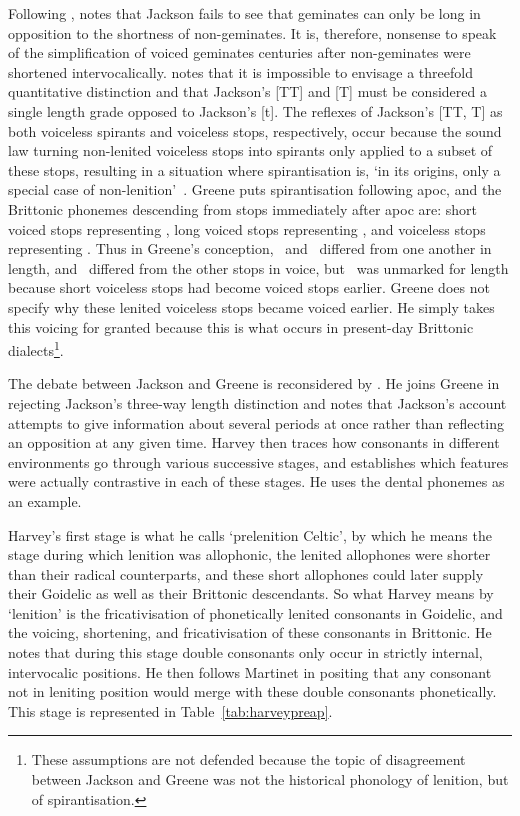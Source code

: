 Following \textcite{martinet_celtic_1952}, \textcite{greene_gemination_1956} notes that Jackson fails to see that geminates can only be long in opposition to the shortness of non-geminates. It is, therefore, nonsense to speak of the simplification of voiced geminates centuries after non-geminates were shortened intervocalically. \Textcite{Gre_Spirant66} notes that it is impossible to envisage a threefold quantitative distinction  and that Jackson's [TT] and [T] must be considered a single length grade opposed to Jackson's [t]. The  reflexes of Jackson's [TT, T] as both voiceless spirants and voiceless stops, respectively, occur because the sound law turning non-lenited voiceless stops into spirants  only applied to a subset of these stops, resulting in a situation where spirantisation is, `in its origins, only a special case of non-lenition'~\autocite[119]{Gre_Spirant66}. Greene puts spirantisation following \gls{apoc}, and the Brittonic \gls{phoneme}s descending from stops immediately after \gls{apoc} are: short voiced stops representing \lT, long voiced stops representing \xD, and voiceless stops representing \xT. Thus in Greene's conception, \lT\ and \xD\ differed from one another in length, and \xT\ differed from the other stops in voice, but \xT\ was unmarked for length because short voiceless stops had become voiced stops earlier. Greene does not specify why these lenited voiceless stops became voiced earlier. He simply takes this voicing for granted because this is what occurs in present-day Brittonic dialects\footnote{These assumptions are not defended because the topic of disagreement between Jackson and Greene was not the historical phonology of lenition, but of spirantisation.}.


The debate between Jackson and Greene is reconsidered by \textcite{harvey_aspects_1984}. He joins Greene in rejecting Jackson's three-way length distinction and notes that Jackson's account attempts to give information about several periods at once rather than reflecting an opposition at any given time. Harvey then traces how consonants in different environments go through various successive stages, and establishes which features were actually contrastive in each of these stages. He uses the dental \gls{phoneme}s as an example.

Harvey's first stage is what he calls `prelenition Celtic', by which he means the stage during which lenition was allophonic, the lenited allophones were shorter than their radical counterparts,  and these short allophones could later supply their Goidelic as well as their Brittonic descendants. So what Harvey means by `lenition' is the fricativisation of phonetically lenited consonants in Goidelic, and the voicing, shortening, and fricativisation of these consonants in Brittonic. He notes that during this stage double consonants only occur in strictly internal, intervocalic positions. He then follows Martinet in positing that any consonant not in leniting position would merge with these double consonants phonetically. This stage is represented in Table~\ref{tab:harveypreap}.


